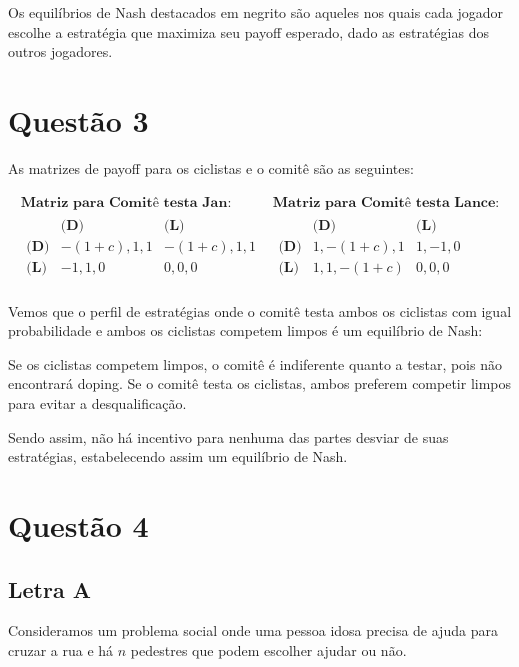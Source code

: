 \documentclass[12pt]{article}
\begin{document}
Os equilíbrios de Nash destacados em negrito são aqueles nos quais cada jogador escolhe a estratégia que maximiza seu payoff esperado, dado as estratégias dos outros jogadores.

\section{\textbf{Questão 3}}
As matrizes de payoff para os ciclistas e o comitê são as seguintes:

\[
\begin{array}{cc}
\textbf{Matriz para Comitê testa Jan:} & \textbf{Matriz para Comitê testa Lance:} \\
\begin{array}{c|cc}
 & \textbf{(D)} & \textbf{(L)} \\
\hline
\textbf{(D)} & -(1+c), 1, 1 & -(1+c), 1, 1 \\
\textbf{(L)} & -1, 1, 0 & 0, 0, 0 \\
\end{array}
&
\begin{array}{c|cc}
 & \textbf{(D)} & \textbf{(L)} \\
\hline
\textbf{(D)} & 1, -(1+c), 1 & 1, -1, 0 \\
\textbf{(L)} & 1, 1, -(1+c) & 0, 0, 0 \\
\end{array}
\end{array}
\]

Vemos que o perfil de estratégias onde o comitê testa ambos os ciclistas com igual probabilidade e ambos os ciclistas competem limpos é um equilíbrio de Nash:

Se os ciclistas competem limpos, o comitê é indiferente quanto a testar, pois não encontrará doping.
Se o comitê testa os ciclistas, ambos preferem competir limpos para evitar a desqualificação.

Sendo assim, não há incentivo para nenhuma das partes desviar de suas estratégias, estabelecendo assim um equilíbrio de Nash.


\section{\textbf{Questão 4}}
\subsection{\textbf{Letra A}}
Consideramos um problema social onde uma pessoa idosa precisa de ajuda para cruzar a rua e há \( n \) pedestres que podem escolher ajudar ou não.
\end{document}
